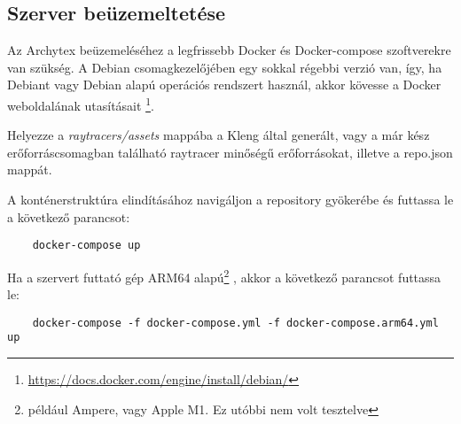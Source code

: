 \subsection{Szerver beüzemeltetése}\label{deploy}
Az Archytex beüzemeléséhez a legfrissebb Docker és Docker-compose szoftverekre van szükség. A Debian csomagkezelőjében egy sokkal régebbi verzió van, így, ha Debiant vagy Debian alapú operációs rendszert használ, akkor kövesse a Docker weboldalának utasításait \footnote{\url{https://docs.docker.com/engine/install/debian/}}.

Helyezze a \emph{raytracers/assets} mappába a Kleng által generált, vagy a már kész erőforráscsomagban található raytracer minőségű erőforrásokat, illetve a repo.json mappát. 

A konténerstruktúra elindításához navigáljon a repository gyökerébe és futtassa le a következő parancsot:
\begin{lstlisting}
    docker-compose up
\end{lstlisting}

Ha a szervert futtató gép ARM64 alapú\footnote{például Ampere, vagy Apple M1. Ez utóbbi nem volt tesztelve} , akkor a következő parancsot futtassa le:
\begin{lstlisting}
    docker-compose -f docker-compose.yml -f docker-compose.arm64.yml up
\end{lstlisting}
